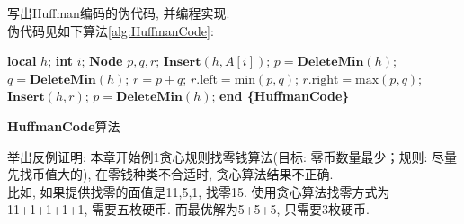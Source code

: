\documentclass{article}
\begin{document}
\begin{homeworkProblem}
	写出Huffman编码的伪代码, 并编程实现. 
	\\

	\solution 伪代码见如下算法\ref{alg:HuffmanCode}:
	\begin{algorithm}[H]
		\begin{algorithmic}[1]
		\State \textbf{local} $h$; 
		\State \textbf{int} $i$;
		\State \textbf{Node} $p,q,r$; 
		 
			\State $\textbf{Insert}(h,A[i])$;
		\EndFor
		 
			\State $p=\textbf{DeleteMin}(h)$; $q=\textbf{DeleteMin}(h)$; 
			\State $r=p+q$; $r
			.\text{left} = \text{min}(p, q)$; $r.\text{right} = \text{max}(p, q)$; 
			\State $\textbf{Insert}(h,r)$; 
		\EndWhile
		\State $p=\textbf{DeleteMin}(h)$; 
		\State \textbf{end \{HuffmanCode\}}
		\end{algorithmic}
		\caption{\textbf{HuffmanCode}算法}
		\label{alg:HuffmanCode}
	\end{algorithm}
\end{homeworkProblem}



\begin{homeworkProblem}
	举出反例证明: 本章开始例1贪心规则找零钱算法(目标: 零币数量最少；规则: 尽量先找币值大的), 在零钱种类不合适时, 贪心算法结果不正确.
	\\

	\solution 比如, 如果提供找零的面值是11,5,1, 找零15.
	使用贪心算法找零方式为11+1+1+1+1, 需要五枚硬币. 而最优解为5+5+5, 只需要3枚硬币.
\end{homeworkProblem}


\pagebreak
\end{document}
